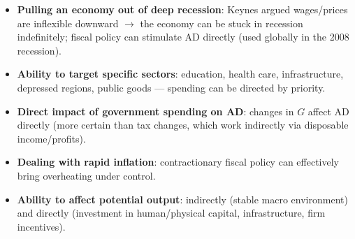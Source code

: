 \begin{itemize}
  \item \textbf{Pulling an economy out of deep recession}: Keynes argued wages/prices are inflexible downward $\to$ the economy can be stuck in recession indefinitely; fiscal policy can stimulate AD directly (used globally in the 2008 recession).
  \item \textbf{Ability to target specific sectors}: education, health care, infrastructure, depressed regions, public goods --- spending can be directed by priority.
  \item \textbf{Direct impact of government spending on AD}: changes in $G$ affect AD directly (more certain than tax changes, which work indirectly via disposable income/profits).
  \item \textbf{Dealing with rapid inflation}: contractionary fiscal policy can effectively bring overheating under control.
  \item \textbf{Ability to affect potential output}: indirectly (stable macro environment) and directly (investment in human/physical capital, infrastructure, firm incentives).
\end{itemize}
